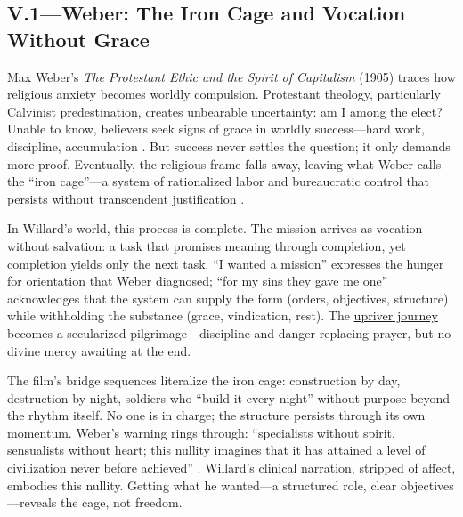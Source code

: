\subsection*{V.1—Weber: The Iron Cage and Vocation Without Grace}
\label{ssec:v-weber}
Max Weber's \textit{The Protestant Ethic and the Spirit of Capitalism} (1905) traces how
religious anxiety becomes worldly compulsion. Protestant theology, particularly Calvinist
predestination, creates unbearable uncertainty: am I among the elect? Unable to know, believers
seek signs of grace in worldly success---hard work, discipline, accumulation
\parencite{WeberProtestant2002}. But success never settles the question; it only demands more
proof. Eventually, the religious frame falls away, leaving what Weber calls the ``iron
cage''---a system of rationalized labor and bureaucratic control that persists without
transcendent justification \parencite{WeberProtestant2002}.

In Willard's world, this process is complete. The mission arrives as vocation without
salvation: a task that promises meaning through completion, yet completion yields only the next
task. ``I wanted a mission'' expresses the hunger for orientation that Weber diagnosed; ``for
my sins they gave me one'' acknowledges that the system can supply the form (orders,
objectives, structure) while withholding the substance (grace, vindication, rest). The
\hyperref[scene:upriver-journey]{upriver journey} becomes a secularized pilgrimage---discipline
and danger replacing prayer, but no divine mercy awaiting at the end.

The film's bridge sequences literalize the iron cage: construction by day, destruction by
night, soldiers who ``build it every night'' without purpose beyond the rhythm itself. No one
is in charge; the structure persists through its own momentum. Weber's warning rings through:
``specialists without spirit, sensualists without heart; this nullity imagines that it has
attained a level of civilization never before achieved'' \parencite{WeberProtestant2002}.
Willard's clinical narration, stripped of affect, embodies this nullity. Getting what he
wanted---a structured role, clear objectives---reveals the cage, not freedom.
